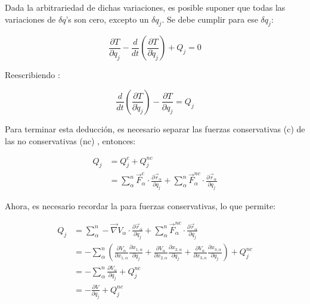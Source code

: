\documentclass[/home/hernan/Documentos/Apuntes_mecanica_teorica/main.tex]{subfiles}
\begin{document}
    Dada la arbitrariedad de dichas variaciones, es posible suponer que todas las variaciones de $\delta q$'s son cero, excepto un $\delta q_{j}$. Se debe cumplir para ese $\delta q_{j}$:

    \begin{equation*}
        \frac{\partial T}{\partial q_{j}}  - \frac{d}{d t} \left(\frac{\partial T}{\partial \dot{q}_{j}} \right)     + Q_{j} = 0
    \end{equation*}

    Reescribiendo :

    \begin{equation*}
        \frac{d}{d t} \left(\frac{\partial T}{\partial \dot{q}_{j}} \right) - \frac{\partial T}{\partial q_{j}} = Q_{j}
    \end{equation*}

    Para terminar esta deducción, es necesario separar las fuerzas conservativas (c) de las no conservativas (nc) , entonces:

    \begin{align*}
        Q_{j} & = Q_{j}^{c} + Q_{j}^{nc} \\ 
            & = \sum_{\alpha}^{n} \vec{F}_{\alpha}^{c} \cdot \frac{\partial \vec{r}_{\alpha}}{\partial q_{j}} + \sum_{\alpha}^{n} \vec{F}_{\alpha}^{nc} \cdot \frac{\partial \vec{r}_{\alpha}}{\partial q_{j}}
    \end{align*}

    Ahora, es necesario recordar la  para fuerzas conservativas, lo que permite: 

    \begin{align*}
        Q_{j} & = \sum_{\alpha}^{n} - \vec{\nabla} V_{\alpha} \cdot \frac{\partial \vec{r}_{\alpha}}{\partial q_{j}} + \sum_{\alpha}^{n} \vec{F}_{\alpha}^{nc} \cdot \frac{\partial \vec{r}_{\alpha}}{\partial q_{j}} \\ 
        & =  - \sum_{\alpha}^{n} \left( \frac{\partial V_{\alpha}}{\partial x_{1,\alpha}} \frac{\partial x_{1,\alpha}}{\partial q_{j}} +   \frac{\partial V_{\alpha}}{\partial x_{2,\alpha}} \frac{\partial x_{2,\alpha}}{\partial q_{j}} + \frac{\partial V_{\alpha}}{\partial x_{3,\alpha}} \frac{\partial x_{3,\alpha}}{\partial q_{j}} \right) + Q_{j}^{nc} \\ 
        & = - \sum_{\alpha}^{n} \frac{\partial V_{\alpha}}{\partial q_{j}} + Q_{j}^{nc} \\ 
        & = - \frac{\partial V}{\partial q_{j}} + Q_{j}^{nc}
    \end{align*}
\end{document}
